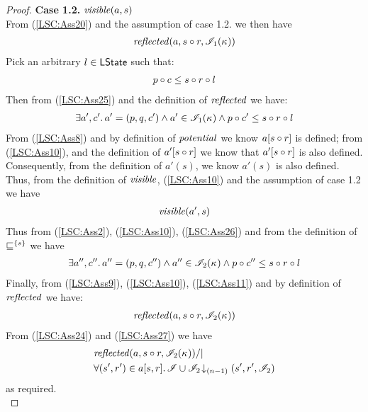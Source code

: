 \begin{lemma}
\begin{proof}
\noindent\textbf{Case 1.2. } $\mathit{visible}(a, s)$\\
From (\ref{LSC:Ass20}) and the assumption of case 1.2. we then have
%
\begin{align}
	\mathit{reflected}(a, s \circ r, \mathscr{I}_1(\kappa_{}))
	\label{LSC:Ass25}
\end{align}
%
Pick an arbitrary $l \in \textsf{LState}$ such that:
%
\begin{align}
	p \circ c \leq s \circ r \circ l \label{LSC:Ass9}
\end{align}
%
Then from (\ref{LSC:Ass25}) and the definition of $\mathit{reflected}$ we have:
\begin{align}
	\exists a', c'.\, a' = (p, q, c') \land a' \in \mathscr{I}_1(\kappa_{}) \land  p \circ c' \leq s \circ r \circ l \label{LSC:Ass10}
\end{align}
From (\ref{LSC:Ass8}) and by definition of $\mathit{potential}$ we know $a[s \circ r]$ is defined; from (\ref{LSC:Ass10}), and the definition of $a'[s \circ r]$ we know that $a'[s \circ r]$ is also defined. Consequently, from the definition of $a'(s)$, we know $a'(s)$ is also defined. Thus, from the definition of $\mathit{visible}$, (\ref{LSC:Ass10}) and the assumption of case 1.2 we have 
%
\begin{align}
	\mathit{visible}(a', s)
	\label{LSC:Ass26}
\end{align}
%
Thus from (\ref{LSC:Ass2}), (\ref{LSC:Ass10}), (\ref{LSC:Ass26}) and from the definition of $\sqsubseteq^{\{s\}}$ we have 
%
\begin{align}
	\exists a'', c''.\, a'' = (p, q, c'') \land a'' \in \mathscr{I}_2(\kappa_{}) \land  p \circ c'' \leq s \circ r \circ l  \label{LSC:Ass11}
\end{align} 
%
Finally, from (\ref{LSC:Ass9}), (\ref{LSC:Ass10}), (\ref{LSC:Ass11}) and by definition of $\mathit{reflected}$ we have:
%
\begin{align}
	\mathit{reflected}(a, s \circ r, \mathscr{I}_2(\kappa_{}))
	\label{LSC:Ass27}
\end{align} 
%
From (\ref{LSC:Ass24}) and (\ref{LSC:Ass27}) we have
\begin{align*}
	&\mathit{reflected}(a, s \circ r, \mathscr{I}_2(\kappa_{})) /| \\
	&\forall (s', r') \in a[s, r].\, \mathscr{I} \cup \mathscr{I}_2 \!\downarrow_{(n-1)} \left(s', r', \mathscr{I}_2\right)
\end{align*}
%
as required.\\
%
%
%
%


\end{proof}
\end{lemma}
